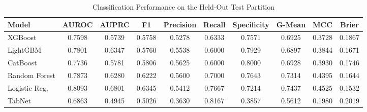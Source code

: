 \begin{table}
\centering
\caption{Classification Performance on the Held-Out Test Partition}
\label{tab:results}
\begin{tabular}{lccccccccc}
\toprule
Model & AUROC & AUPRC & F1 & Precision & Recall & Specificity & G-Mean & MCC & Brier \\
\midrule
XGBoost & 0.7598 & 0.5739 & 0.5758 & 0.5278 & 0.6333 & 0.7571 & 0.6925 & 0.3728 & 0.1867 \\
LightGBM & 0.7801 & 0.6347 & 0.5760 & 0.5538 & 0.6000 & 0.7929 & 0.6897 & 0.3844 & 0.1671 \\
CatBoost & 0.7736 & 0.5781 & 0.5806 & 0.5625 & 0.6000 & 0.8000 & 0.6928 & 0.3930 & 0.1746 \\
Random Forest & 0.7873 & 0.6280 & 0.6222 & 0.5600 & 0.7000 & 0.7643 & 0.7314 & 0.4395 & 0.1644 \\
Logistic Reg. & 0.8093 & 0.6801 & 0.6345 & 0.5412 & 0.7667 & 0.7214 & 0.7437 & 0.4525 & 0.1532 \\
TabNet & 0.6863 & 0.4945 & 0.5026 & 0.3630 & 0.8167 & 0.3857 & 0.5612 & 0.1980 & 0.2019 \\
\bottomrule
\end{tabular}
\end{table}
